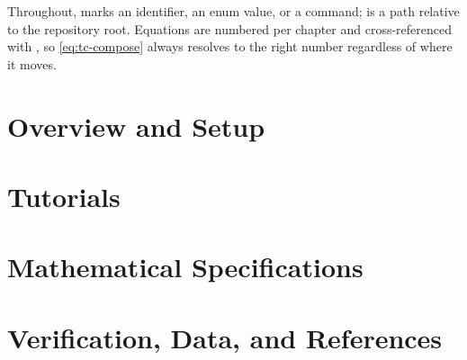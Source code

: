 \documentclass[11pt,twoside,openright]{book}
\begin{document}
Throughout,  marks an identifier, an enum value, or a command;
 is a path relative to the repository root. Equations are
numbered per chapter and cross-referenced with , so
\cref{eq:tc-compose} always resolves to the right number regardless of where it
moves.

\tableofcontents

\mainmatter
{}

\part{Overview and Setup}
\label{part:overview}







\part{Tutorials}
\label{part:tutorials}



\part{Mathematical Specifications}
\label{part:math}













\part{Verification, Data, and References}
\label{part:verification}





\backmatter


\end{document}
